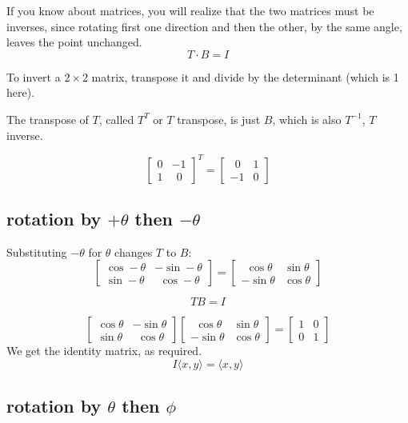 \documentclass[11pt, oneside]{article}
\begin{document}
If you know about matrices, you will realize that the two matrices must be inverses, since rotating first one direction and then the other, by the same angle, leaves the point unchanged.
\[ T \cdot  B= I \]

To invert a $2 \times 2$ matrix, transpose it and divide by the determinant (which is 1 here).

The transpose of $T$, called $T^T$ or $T$ transpose, is just $B$, which is also $T^{-1}$, $T$ inverse.

\[
\begin{bmatrix}  
0 & -1 \\
1 & \ \ 0
\end{bmatrix}^T
=
\begin{bmatrix}  
\ \ 0 & 1 \\
-1 & 0
\end{bmatrix}
\]

\subsection*{rotation by $+ \theta$ then $- \theta$}
Substituting $- \theta$ for $\theta$ changes $T$ to $B$:
\[
\begin{bmatrix}  
\cos -\theta & -\sin - \theta \\
\sin - \theta & \ \  \cos - \theta
\end{bmatrix}
=
\begin{bmatrix}  
\ \ \cos \theta & \sin \theta \\
- \sin \theta &  \cos \theta
\end{bmatrix}
\]

\[ TB = I \]

\[
\begin{bmatrix}  
\cos \theta & -\sin \theta \\
\sin \theta & \ \  \cos \theta
\end{bmatrix}
\begin{bmatrix}  
\ \ \cos \theta & \sin \theta \\
- \sin \theta &  \cos \theta
\end{bmatrix}
=
\begin{bmatrix}  
1 & 0 \\
0 & 1
\end{bmatrix}
\]
We get the identity matrix, as required.
\[ I \langle x,y \rangle = \langle x,y \rangle \]

\subsection*{rotation by $\theta$ then $\phi$}
\end{document}
